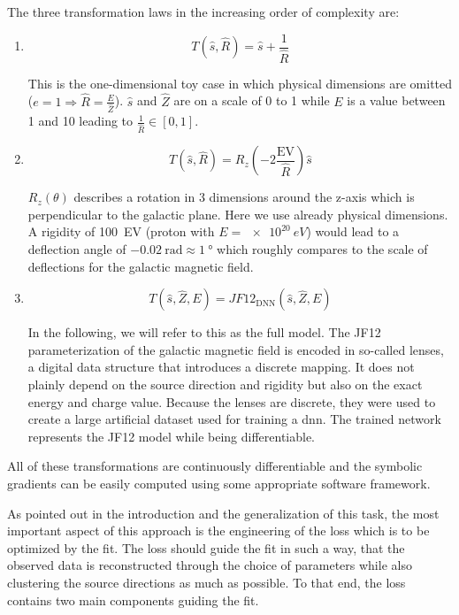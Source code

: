 The three transformation laws in the increasing order of complexity are:
\begin{enumerate}
    \item \begin{equation}\label{eq:sc1}
        T(\hat s, \hat R) = \hat s + \frac1{\hat R}
    \end{equation}

    This is the one-dimensional toy case in which physical dimensions are omitted (\(e=1 \Rightarrow \hat R = \frac{E}{\hat Z}\)). \(\hat s\) and \(\hat Z\) are on a scale of 0 to 1 while \(E\) is a value between 1 and 10 leading to \(\frac1{\hat R} \in [0, 1]\).

    \item \begin{equation}\label{eq:sc2}
        T(\hat s, \hat R) = R_z \left(- 2 \frac{\si{\exa\volt}}{\hat R}\right) \hat s
    \end{equation}

    \(R_z(\theta)\) describes a rotation in 3 dimensions around the z-axis which is perpendicular to the galactic plane. Here we use already physical dimensions. A rigidity of \SI{100}{\exa\volt} (proton with \(E=\SI{e20}{eV}\)) would lead to a deflection angle of \(\SI{-0.02}{\radian} \approx \SI{1}{\degree}\) which roughly compares to the scale of deflections for the galactic magnetic field.

    \item \begin{equation}\label{eq:sc3}
        T(\hat s, \hat Z, E) = JF12_\text{DNN}(\hat s, \hat Z, E)
    \end{equation}

    In the following, we will refer to this as the full model. The JF12 parameterization of the galactic magnetic field is encoded in so-called lenses, a digital data structure that introduces a discrete mapping. It does not plainly depend on the source direction and rigidity but also on the exact energy and charge value. Because the lenses are discrete, they were used to create a large artificial dataset used for training a \gls{dnn}. The trained network represents the JF12 model while being differentiable.
\end{enumerate}

All of these transformations are continuously differentiable and the symbolic gradients can be easily computed using some appropriate software framework.

As pointed out in the introduction and the generalization of this task, the most important aspect of this approach is the engineering of the loss which is to be optimized by the fit. The loss should guide the fit in such a way, that the observed data is reconstructed through the choice of parameters while also clustering the source directions as much as possible. To that end, the loss contains two main components guiding the fit.

